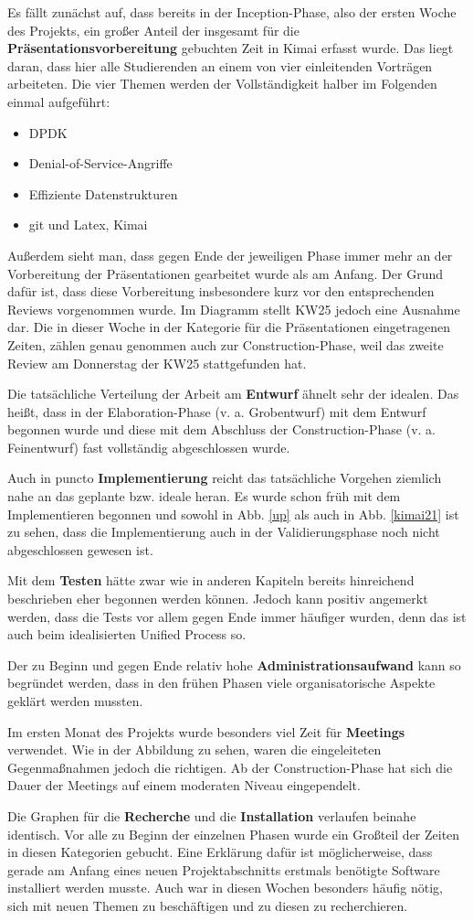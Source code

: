 \documentclass[../review_3.tex]{subfiles}
\begin{document}
Es fällt zunächst auf, dass bereits in der Inception-Phase, also der ersten Woche des Projekts, ein großer Anteil der insgesamt für die \textbf{Präsentationsvorbereitung} gebuchten Zeit in Kimai erfasst wurde. Das liegt daran, dass hier alle Studierenden an einem von vier einleitenden Vorträgen arbeiteten. Die vier Themen werden der Vollständigkeit halber im Folgenden einmal aufgeführt:
\begin{itemize}
    \item DPDK
    \item Denial-of-Service-Angriffe
    \item Effiziente Datenstrukturen
    \item git und Latex, Kimai
\end{itemize}
Außerdem sieht man, dass gegen Ende der jeweiligen Phase immer mehr an der Vorbereitung der Präsentationen gearbeitet wurde als am Anfang. Der Grund dafür ist, dass diese Vorbereitung insbesondere kurz vor den entsprechenden Reviews vorgenommen wurde. Im Diagramm stellt KW25 jedoch eine Ausnahme dar. Die in dieser Woche in der Kategorie für die Präsentationen eingetragenen Zeiten, zählen genau genommen auch zur Construction-Phase, weil das zweite Review am Donnerstag der KW25 stattgefunden hat.

Die tatsächliche Verteilung der Arbeit am \textbf{Entwurf} ähnelt sehr der idealen. Das heißt, dass in der Elaboration-Phase (v. a. Grobentwurf) mit dem Entwurf begonnen wurde und diese mit dem Abschluss der Construction-Phase (v. a. Feinentwurf) fast vollständig abgeschlossen wurde.

Auch in puncto \textbf{Implementierung} reicht das tatsächliche Vorgehen ziemlich nahe an das geplante bzw. ideale heran. Es wurde schon früh mit dem Implementieren begonnen und sowohl in Abb. \ref{up} als auch in Abb. \ref{kimai21} ist zu sehen, dass die Implementierung auch in der Validierungsphase noch nicht abgeschlossen gewesen ist.

Mit dem \textbf{Testen} hätte zwar wie in anderen Kapiteln bereits hinreichend beschrieben eher begonnen werden können. Jedoch kann positiv angemerkt werden, dass die Tests vor allem gegen Ende immer häufiger wurden, denn das ist auch beim idealisierten Unified Process so.

Der zu Beginn und gegen Ende relativ hohe \textbf{Administrationsaufwand} kann so begründet werden, dass in den frühen Phasen viele organisatorische Aspekte geklärt werden mussten.

Im ersten Monat des Projekts wurde besonders viel Zeit für \textbf{Meetings} verwendet. Wie in der Abbildung zu sehen, waren die eingeleiteten Gegenmaßnahmen jedoch die richtigen. Ab der Construction-Phase hat sich die Dauer der Meetings auf einem moderaten Niveau eingependelt.

Die Graphen für die \textbf{Recherche} und die \textbf{Installation} verlaufen beinahe identisch. Vor alle zu Beginn der einzelnen Phasen wurde ein Großteil der Zeiten in diesen Kategorien gebucht. Eine Erklärung dafür ist möglicherweise, dass gerade am Anfang eines neuen Projektabschnitts erstmals benötigte Software installiert werden musste. Auch war in diesen Wochen besonders häufig nötig, sich mit neuen Themen zu beschäftigen und zu diesen zu recherchieren.
\end{document}
